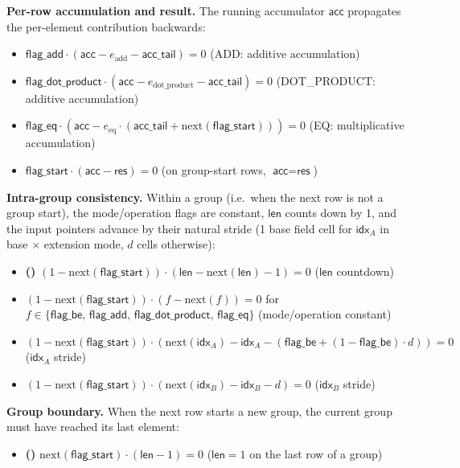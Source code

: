 \documentclass{article}
\theoremstyle{definition}
\newcommand{\extdeg}{d} %
\begin{document}
\textbf{Per-row accumulation and result.} The running accumulator $\textsf{acc}$ propagates the per-element contribution backwards:
\begin{itemize}
    \item $\textsf{flag\_add} \cdot (\textsf{acc} - e_\text{add} - \textsf{acc\_tail}) = 0$ \hfill (ADD: additive accumulation)
    \item $\textsf{flag\_dot\_product} \cdot (\textsf{acc} - e_\text{dot\_product} - \textsf{acc\_tail}) = 0$ \hfill (DOT\_PRODUCT: additive accumulation)
    \item $\textsf{flag\_eq} \cdot (\textsf{acc} - e_\text{eq} \cdot (\textsf{acc\_tail} + \text{next}(\textsf{flag\_start}))) = 0$ \hfill (EQ: multiplicative accumulation)
    \item $\textsf{flag\_start} \cdot (\textsf{acc} - \textsf{res}) = 0$ \hfill (on group-start rows, $\textsf{acc} = \textsf{res}$)
\end{itemize}

\textbf{Intra-group consistency.} Within a group (i.e.\ when the next row is not a group start), the mode/operation flags are constant, $\textsf{len}$ counts down by 1, and the input pointers advance by their natural stride (1 base field cell for $\textsf{idx}_A$ in base $\times$ extension mode, $\extdeg$ cells otherwise):
\begin{itemize}
    \item {}\textbf{(\theequation)}\label{c:len-countdown}\hspace{1mm} $(1 - \text{next}(\textsf{flag\_start})) \cdot (\textsf{len} - \text{next}(\textsf{len}) - 1) = 0$ \hfill ($\textsf{len}$ countdown)
    \item $(1 - \text{next}(\textsf{flag\_start})) \cdot (f - \text{next}(f)) = 0$ for $f \in \{\textsf{flag\_be},\, \textsf{flag\_add},\, \textsf{flag\_dot\_product},\, \textsf{flag\_eq}\}$ \hfill (mode/operation constant)
    \item $(1 - \text{next}(\textsf{flag\_start})) \cdot (\text{next}(\textsf{idx}_A) - \textsf{idx}_A - (\textsf{flag\_be} + (1 - \textsf{flag\_be}) \cdot \extdeg)) = 0$ \hfill ($\textsf{idx}_A$ stride)
    \item $(1 - \text{next}(\textsf{flag\_start})) \cdot (\text{next}(\textsf{idx}_B) - \textsf{idx}_B - \extdeg) = 0$ \hfill ($\textsf{idx}_B$ stride)
\end{itemize}

\textbf{Group boundary.} When the next row starts a new group, the current group must have reached its last element:
\begin{itemize}
    \item {}\textbf{(\theequation)}\label{c:len-boundary}\hspace{1mm} $\text{next}(\textsf{flag\_start}) \cdot (\textsf{len} - 1) = 0$ \hfill ($\textsf{len} = 1$ on the last row of a group)
\end{itemize}
\end{document}
